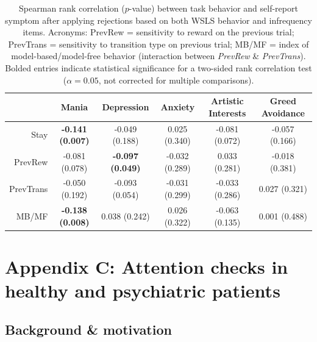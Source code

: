 \documentclass[a4paper,notitlepage,12pt]{article}
\begin{document}
\begin{refsection}[supp]
\begin{table}[H]
    \centering
    \begin{adjustbox}{center}   
    \small
    \begin{tabular}{rccccc}
        \toprule
        {} & Mania & Depression & Anxiety & Artistic Interests & Greed Avoidance \\
        \midrule
        Stay      &  \textbf{-0.141 (0.007)} &           -0.049 (0.188) &   0.025 (0.340) &  -0.081 (0.072) &  -0.057 (0.166) \\
        PrevRew   &           -0.081 (0.078) &  \textbf{-0.097 (0.049)} &  -0.032 (0.289) &   0.033 (0.281) &  -0.018 (0.381) \\
        PrevTrans &           -0.050 (0.192) &           -0.093 (0.054) &  -0.031 (0.299) &  -0.033 (0.286) &   0.027 (0.321) \\
        MB/MF     &  \textbf{-0.138 (0.008)} &            0.038 (0.242) &   0.026 (0.322) &  -0.063 (0.135) &   0.001 (0.488) \\
        \bottomrule
    \end{tabular}
    \end{adjustbox}
    \caption{Spearman rank correlation ($p$-value) between task behavior and self-report symptom after applying rejections based on both WSLS behavior and infrequency items. Acronyms: PrevRew = sensitivity to reward on the previous trial; PrevTrans = sensitivity to transition type on previous trial; MB/MF = index of model-based/model-free behavior (interaction between \textit{PrevRew} \& \textit{PrevTrans}). Bolded entries indicate statistical significance for a two-sided rank correlation test ($\alpha = 0.05$, not corrected for multiple comparisons).}
\end{table}

\break
\section*{Appendix C: Attention checks in healthy and psychiatric patients}

\subsection*{Background \& motivation}


\end{refsection}
\end{document}
